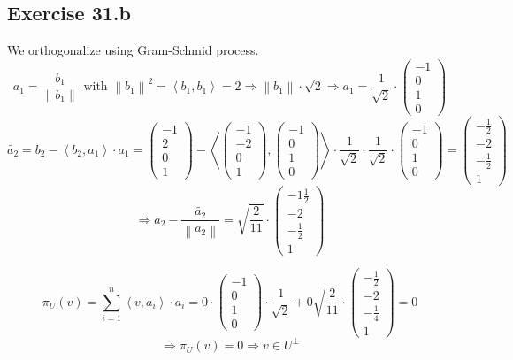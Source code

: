 \documentclass[a4paper]{article}
\theoremstyle{definition}
\newcommand\fun[1]{\left\langle{#1}\right\rangle}
\newcommand\norm[1]{\left\|{#1}\right\|}
\begin{document}
\subsection{Exercise 31.b}
We orthogonalize using Gram-Schmid process.
\[ a_1 = \frac{b_1}{\norm{b_1}} \text{ with } \norm{b_1}^2 = \fun{b_1, b_1} = 2 \Rightarrow \norm{b_1} \cdot \sqrt{2} \Rightarrow a_1 = \frac{1}{\sqrt 2} \cdot \begin{pmatrix} -1 \\ 0 \\ 1 \\ 0 \end{pmatrix} \]
\[ \tilde{a_2} = b_2 - \fun{b_2, a_1} \cdot a_1 = \begin{pmatrix} -1 \\ 2 \\ 0 \\ 1 \end{pmatrix} - \fun{\begin{pmatrix} -1 \\ -2 \\ 0 \\ 1 \end{pmatrix}, \begin{pmatrix} -1 \\ 0 \\ 1 \\ 0 \end{pmatrix}} \cdot \frac{1}{\sqrt 2} \cdot \frac{1}{\sqrt 2} \cdot \begin{pmatrix} -1 \\ 0 \\ 1 \\ 0 \end{pmatrix} = \begin{pmatrix} -\frac12 \\ -2 \\ -\frac12 \\ 1 \end{pmatrix} \]
\[ \Rightarrow a_2 - \frac{\tilde{a_2}}{\norm{a_2}} = \sqrt{\frac2{11}} \cdot \begin{pmatrix} -1\frac12 \\ -2 \\ -\frac12 \\ 1 \end{pmatrix} \]

\[ \pi_U(v) = \sum_{i=1}^n \fun{v, a_i} \cdot a_i = 0 \cdot \begin{pmatrix} -1 \\ 0 \\ 1 \\ 0 \end{pmatrix} \cdot \frac1{\sqrt{2}} + 0 \sqrt{\frac{2}{11}} \cdot \begin{pmatrix} -\frac12 \\ -2 \\ -\frac14 \\ 1 \end{pmatrix} = 0 \]
\[ \Rightarrow \pi_U(v) = 0 \Rightarrow v \in U^{\bot} \]
\end{document}
